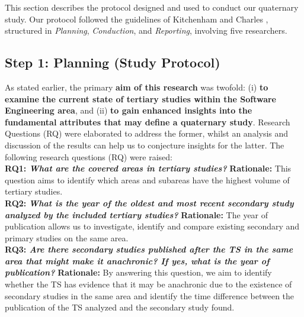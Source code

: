 \documentclass[sigconf]{acmart}
\begin{document}
This section describes the protocol designed and used to conduct our quaternary study. Our protocol followed the guidelines of Kitchenham and Charles \cite{Kitchenham2007}, structured in \textit{Planning}, \textit{Conduction}, and \textit{Reporting}, involving five researchers.
\vspace{-0.2cm}
\subsection{Step 1: Planning (Study Protocol)}
\label{sec:systematic_mapping_results}

As stated earlier, the primary \textbf{aim of this research} was twofold: (i) \textbf{to examine the current state of tertiary studies within the Software Engineering area}, and (ii) \textbf{to gain enhanced insights into the fundamental attributes that may define a quaternary study}. Research Questions (RQ) were elaborated to address the former, whilst an analysis and discussion of the results can help us to conjecture insights for the latter. The following research questions (RQ) were raised:
\\
\textbf{RQ1: \textit{What are the covered areas in tertiary studies?}} \textbf{Rationale:} This question aims to identify which areas and subareas have the highest volume of tertiary studies.\\
\textbf{RQ2:} \textbf{\textit{What is the year of the oldest and most recent secondary study analyzed by the included tertiary studies?}} \textbf{Rationale:} The year of publication allows us to investigate, identify and compare existing secondary and primary studies on the same area. \\
\textbf{RQ3: \textit{Are there secondary studies published after the TS in the same area that might make it anachronic? If yes, what is the year of publication?}} \textbf{Rationale:} By answering this question, we aim to identify whether the TS has evidence that it may be anachronic due to the existence of secondary studies in the same area and identify the time difference between the publication of the TS analyzed and the secondary study found.\\
\end{document}
